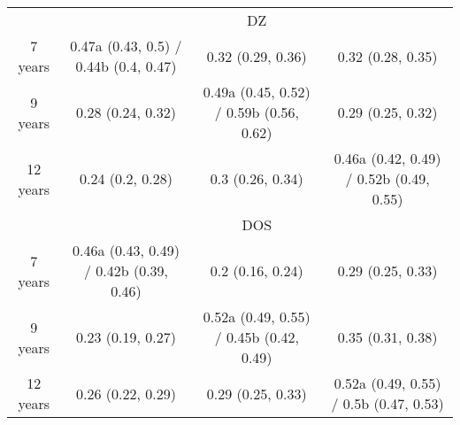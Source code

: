 \begin{tabular}{ccccc}
  \cmidrule{1-5}          & \multicolumn{4}{c}{DZ} \\
  7 years & \multicolumn{2}{c}{0.47a (0.43, 0.5) / 0.44b (0.4, 0.47)} & 0.32 (0.29, 0.36) & 0.32 (0.28, 0.35) \\
  9 years & \multicolumn{2}{c}{0.28 (0.24, 0.32)} & 0.49a (0.45, 0.52) / 0.59b (0.56, 0.62) & 0.29 (0.25, 0.32) \\
  12 years & \multicolumn{2}{c}{0.24 (0.2, 0.28)} & 0.3 (0.26, 0.34) & 0.46a (0.42, 0.49) / 0.52b (0.49, 0.55) \\
  \cmidrule{1-5}          & \multicolumn{4}{c}{DOS} \\
  7 years & \multicolumn{2}{c}{0.46a (0.43, 0.49) / 0.42b (0.39, 0.46)} & 0.2 (0.16, 0.24) & 0.29 (0.25, 0.33) \\
  9 years & \multicolumn{2}{c}{0.23 (0.19, 0.27)} & 0.52a (0.49, 0.55) / 0.45b (0.42, 0.49) & 0.35 (0.31, 0.38) \\
  12 years & \multicolumn{2}{c}{0.26 (0.22, 0.29)} & 0.29 (0.25, 0.33) & 0.52a (0.49, 0.55) / 0.5b (0.47, 0.53) \\
  \bottomrule
\end{tabular}%

